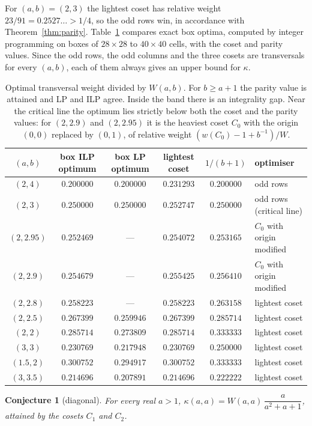 \documentclass[11pt]{amsart}
\newtheorem{conjecture}[theorem]{Conjecture}
\theoremstyle{definition}
\begin{document}
For $(a,b)=(2,3)$ the lightest coset has relative weight $23/91=0.2527\ldots>1/4$, so the odd rows win, in accordance with Theorem~\ref{thm:parity}. Table~\ref{tab:band} compares exact box optima, computed by integer programming on boxes of $28\times28$ to $40\times40$ cells, with the coset and parity values. Since the odd rows, the odd columns and the three cosets are transversals for every $(a,b)$, each of them always gives an upper bound for $\kappa$.

\begin{table}[ht]
\centering\small
\begin{tabular}{cccccl}
\toprule
$(a,b)$ & box ILP optimum & box LP optimum & lightest coset & $1/(b+1)$ & optimiser\\
\midrule
$(2,4)$ & $0.200000$ & $0.200000$ & $0.231293$ & $0.200000$ & odd rows\\
$(2,3)$ & $0.250000$ & $0.250000$ & $0.252747$ & $0.250000$ & odd rows (critical line)\\
$(2,2.95)$ & $0.252469$ & --- & $0.254072$ & $0.253165$ & $C_0$ with origin modified\\
$(2,2.9)$ & $0.254679$ & --- & $0.255425$ & $0.256410$ & $C_0$ with origin modified\\
$(2,2.8)$ & $0.258223$ & --- & $0.258223$ & $0.263158$ & lightest coset\\
$(2,2.5)$ & $0.267399$ & $0.259946$ & $0.267399$ & $0.285714$ & lightest coset\\
$(2,2)$ & $0.285714$ & $0.273809$ & $0.285714$ & $0.333333$ & lightest coset\\
$(3,3)$ & $0.230769$ & $0.217948$ & $0.230769$ & $0.250000$ & lightest coset\\
$(1.5,2)$ & $0.300752$ & $0.294917$ & $0.300752$ & $0.333333$ & lightest coset\\
$(3,3.5)$ & $0.214696$ & $0.207891$ & $0.214696$ & $0.222222$ & lightest coset\\
\bottomrule
\end{tabular}
\caption{Optimal transversal weight divided by $W(a,b)$. For $b\ge a+1$ the parity value is attained and LP and ILP agree. Inside the band there is an integrality gap. Near the critical line the optimum lies strictly below both the coset and the parity values: for $(2,2.9)$ and $(2,2.95)$ it is the heaviest coset $C_0$ with the origin $(0,0)$ replaced by $(0,1)$, of relative weight $(w(C_0)-1+b^{-1})/W$.}
\label{tab:band}
\end{table}

\begin{conjecture}[diagonal]\label{conj:phase}
For every real $a>1$, $\kappa(a,a)=W(a,a)\,\dfrac{a}{a^2+a+1}$, attained by the cosets $C_1$ and $C_2$.
\end{conjecture}
\end{document}
